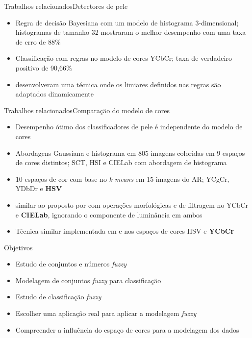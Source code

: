 \begin{frame}{Trabalhos relacionados}{Detectores de pele}
\begin{itemize}
    \item Regra de decisão Bayesiana com um modelo de histograma $3$-dimensional; histogramas de tamanho 32 mostraram o melhor desempenho com uma taxa de erro de 88\% \citep{jones:02}
    \item Classificação com regras no modelo de cores YCbCr; taxa de verdadeiro positivo de 90,66\% \citep{kovac:03}
    \item \citet{yogarajah:11} desenvolveram uma técnica onde os limiares definidos nas regras são adaptados dinamicamente
\end{itemize}
\end{frame}

\begin{frame}{Trabalhos relacionados}{Comparação do modelo de cores}
\begin{itemize}
    \item Desempenho ótimo dos classificadores de pele é independente do modelo de cores \citep{albiol:01}
    \item Abordagens Gaussiana e histograma em 805 imagens coloridas em 9 espaços de cores distintos; SCT, HSI e CIELab com abordagem de histograma \citep{jayaram:04}
    \item 10 espaços de cor com base no \emph{k-means} em 15 imagens do AR; YCgCr, YDbDr e \textbf{HSV} \citep{chaves:10}
    \item \citet{kaur:12} similar ao proposto por \citet{kovac:03} com operações morfológicas e de filtragem no YCbCr e \textbf{CIELab}, ignorando o componente de luminância em ambos
    \item Técnica similar implementada em \citet{shaik:15} e \citet{kumar:15} nos espaços de cores HSV e \textbf{YCbCr}
\end{itemize}
\end{frame}

\begin{frame}{Objetivos}
\begin{itemize}
    \item Estudo de conjuntos e números \emph{fuzzy}
    \item Modelagem de conjuntos \emph{fuzzy} para classificação
    \item Estudo de classificação \emph{fuzzy}
    \item Escolher uma aplicação real para aplicar a modelagem \emph{fuzzy}
    \item Compreender a influência do espaço de cores para a modelagem dos dados
\end{itemize}
\end{frame}